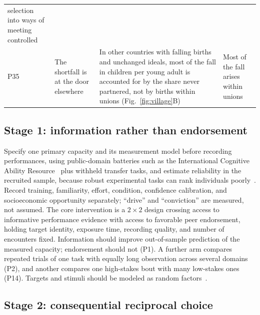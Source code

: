 \begin{table}[tp]
\begin{tabularx}{\textwidth}{@{}P{0.028\textwidth}P{0.19\textwidth}LP{0.25\textwidth}@{}}
selection into ways of meeting controlled\\
P35 & The shortfall is at the door elsewhere & In other countries with falling births and unchanged ideals, most of the
fall in children per young adult is accounted for by the share never partnered, not by births within unions
(Fig.~\ref{fig:village}B) & Most of the fall arises within unions\\
\bottomrule
\end{tabularx}
\end{table}

\subsection{Stage 1: information rather than endorsement}

Specify one primary capacity and its measurement model before recording performances, using public-domain batteries such as
the International Cognitive Ability Resource~\cite{condon2014} plus withheld transfer tasks, and estimate reliability in the
recruited sample, because robust experimental tasks can rank individuals poorly~\cite{hedge2018}. Record training,
familiarity, effort, condition, confidence calibration, and socioeconomic opportunity separately; ``drive'' and
``conviction'' are measured, not assumed. The core intervention is a $2\times2$ design crossing access to informative
performance evidence with access to favorable peer endorsement, holding target identity, exposure time, recording quality,
and number of encounters fixed. Information should improve out-of-sample prediction of the measured capacity; endorsement
should not (P1). A further arm compares repeated trials of one task with equally long observation across several domains
(P2), and another compares one high-stakes bout with many low-stakes ones (P14). Targets and stimuli should be modeled as
random factors~\cite{judd2012,westfall2014}.

\subsection{Stage 2: consequential reciprocal choice}

